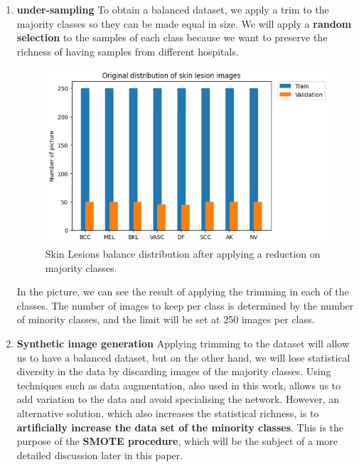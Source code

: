 \begin{enumerate}
    \item \textbf{under-sampling}
        To obtain a balanced dataset, we apply a trim to the majority classes so they can be made equal in size.  We will apply a \textbf{random selection} to the samples of each class because we want to preserve the richness of having samples from different hospitals.

        \begin{figure}[ht]
            \begin{center}
                \includegraphics[scale=0.5]{images/Building/Skin lesion Balance distribution.png}
                \caption{Skin Lesions balance distribution after applying a reduction on majority classes.}
            \label{fig: Skin Lesions balance distribution}    
            \end{center}
        \end{figure}
        
    In the picture, we can see the result of applying the trimming in each of the classes. The number of images to keep per class is determined by the number of minority classes, and the limit will be set at 250 images per class.
        

    \item \textbf{Synthetic image generation} 
        \label{pr: synthetic_image_generation}
        Applying trimming to the dataset will allow us to have a balanced dataset, but on the other hand, we will lose statistical diversity in the data by discarding images of the majority classes. Using techniques such as data augmentation, also used in this work, allows us to add variation to the data and avoid specialising the network. However, an alternative solution, which also increases the statistical richness, is to \textbf{artificially increase the data set of the minority classes}. This is the purpose of the \textbf{SMOTE procedure}, which will be the subject of a more detailed discussion later in this paper.
    
\end{enumerate}

